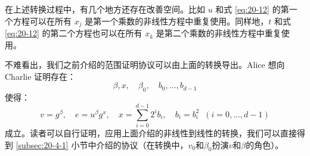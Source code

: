 在上述转换过程中，有几个地方还存在改善空间。比如 $u$ 和式 \ref{eq:20-12} 的第一个方程可以在所有 $x_j$ 是第一个乘数的非线性方程中重复使用。同样地，$t$ 和式 \ref{eq:20-12} 的第二个方程也可以在所有 $x_k$ 是第二个乘数的非线性方程中重复使用。

\begin{snote}[范围证明2.]
不难看出，我们之前介绍的范围证明协议可以由上面的转换导出。Alice 想向 Charlie 证明存在：
\[
\beta,x,
\quad
\beta_0,
\quad
b_0,\dots,b_{d-1}
\]
使得：
\[
v=g^\beta,
\quad
e=u^\beta g^x,
\quad
x=\sum_{i=0}^{d-1}2^ib_i,
\quad
b_i=b^2_i
\;\;
(i=0,\dots,d-1)
\]
成立。读者可以自行证明，应用上面介绍的非线性到线性的转换，我们可以直接得到 \ref{subsec:20-4-1} 小节中介绍的协议（在转换中，$v_0$和$\beta_0$扮演$v$和$\beta$的角色）。
\end{snote}